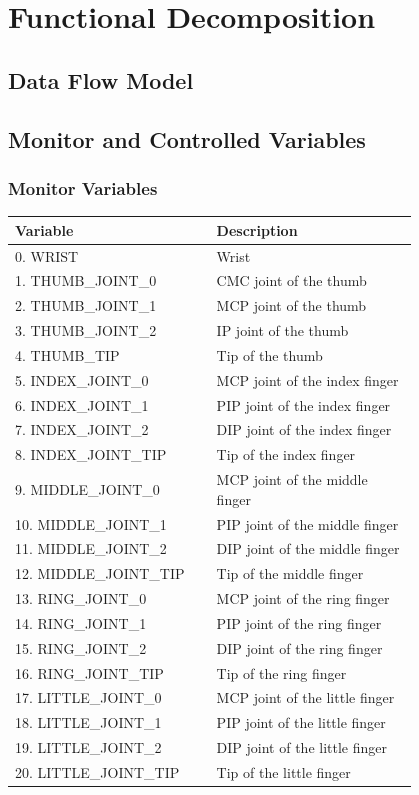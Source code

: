 \documentclass[12pt]{article}
\begin{document}
\section{Functional Decomposition}
\subsection{Data Flow Model}

\newpage
\subsection{Monitor and Controlled Variables}
\subsubsection{Monitor Variables}

\renewcommand{\arraystretch}{1.2}
\noindent \begin{tabularx}{\textwidth}{p{0.4\linewidth}|p{0.4\linewidth}}
\toprule
\textbf{Variable} & \textbf{Description}\\
\midrule
0. WRIST 
& Wrist \\
\hline
1. THUMB\_JOINT\_0
&CMC joint of the thumb\\
\hline
2. THUMB\_JOINT\_1
&MCP joint of the thumb\\
\hline
3. THUMB\_JOINT\_2
&IP joint of the thumb\\
\hline
4. THUMB\_TIP
&Tip of the thumb\\
\hline
5. INDEX\_JOINT\_0
&MCP joint of the index finger\\
\hline
6. INDEX\_JOINT\_1
&PIP joint of the index finger\\
\hline
7. INDEX\_JOINT\_2
&DIP joint of the index finger\\
\hline
8. INDEX\_JOINT\_TIP
&Tip of the index finger\\
\hline
9. MIDDLE\_JOINT\_0
&MCP joint of the middle finger\\
\hline
10. MIDDLE\_JOINT\_1
&PIP joint of the middle finger\\
\hline
11. MIDDLE\_JOINT\_2
&DIP joint of the middle finger\\
\hline
12. MIDDLE\_JOINT\_TIP
&Tip of the middle finger\\
\hline
13. RING\_JOINT\_0
&MCP joint of the ring finger\\
\hline
14. RING\_JOINT\_1
&PIP joint of the ring finger\\
\hline
15. RING\_JOINT\_2
&DIP joint of the ring finger\\
\hline
16. RING\_JOINT\_TIP
&Tip of the ring finger\\
\hline
17. LITTLE\_JOINT\_0
&MCP joint of the little finger\\
\hline
18. LITTLE\_JOINT\_1
&PIP joint of the little finger\\
\hline
19. LITTLE\_JOINT\_2
&DIP joint of the little finger\\
\hline
20. LITTLE\_JOINT\_TIP
&Tip of the little finger\\
\bottomrule
\end{tabularx}
\end{document}
